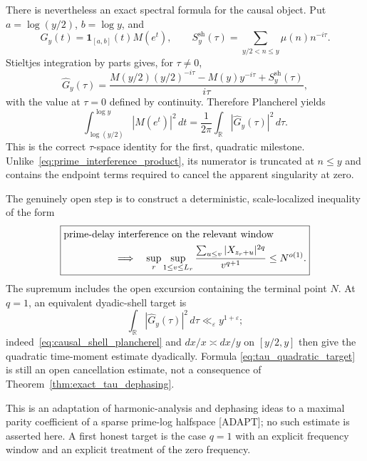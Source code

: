 \documentclass[11pt]{amsart}
\numberwithin{equation}{section}
\theoremstyle{plain}
\theoremstyle{definition}
\theoremstyle{remark}
\newcommand{\Mob}{\mu}
\newcommand{\Mert}{M}
\newcommand{\eps}{\varepsilon}
\begin{document}
There is nevertheless an exact spectral formula for the causal object.  Put
$a=\log(y/2)$, $b=\log y$, and
\begin{equation}
G_y(t)=\mathbf 1_{[a,b]}(t)\Mert(e^t),
\qquad
S_y^{\mathrm{sh}}(\tau)=
\sum_{y/2<n\leq y}\Mob(n)n^{-i\tau}.
\end{equation}
Stieltjes integration by parts gives, for $\tau\ne0$,
\begin{equation}
\widehat G_y(\tau)=
\frac{
\Mert(y/2)(y/2)^{-i\tau}-\Mert(y)y^{-i\tau}
+S_y^{\mathrm{sh}}(\tau)}{i\tau},
\label{eq:causal_shell_transform}
\end{equation}
with the value at $\tau=0$ defined by continuity.  Therefore Plancherel yields
\begin{equation}
\int_{\log(y/2)}^{\log y}|\Mert(e^t)|^2\,dt
=\frac1{2\pi}\int_{\mathbb R}|\widehat G_y(\tau)|^2\,d\tau.
\label{eq:causal_shell_plancherel}
\end{equation}
This is the correct $\tau$-space identity for the first, quadratic milestone.
Unlike~\eqref{eq:prime_interference_product}, its numerator is truncated at
$n\leq y$ and contains the endpoint terms required to cancel the apparent
singularity at zero.

The genuinely open step is to construct a deterministic, scale-localized
inequality of the form
\begin{equation}
\boxed{
\begin{aligned}
&\text{prime-delay interference on the relevant window}\\
&\hspace{18mm}\Longrightarrow\quad
\sup_{r}\sup_{1\leq v\leq L_r}
\frac{\sum_{u\leq v}|X_{z_r+u}|^{2q}}{v^{q+1}}
\leq N^{o(1)}.
\end{aligned}}
\label{eq:central_dephasing_bridge}
\end{equation}
The supremum includes the open excursion containing the terminal point $N$.
At $q=1$, an equivalent dyadic-shell target is
\begin{equation}
\int_{\mathbb R}|\widehat G_y(\tau)|^2\,d\tau
\ll_\eps y^{1+\eps};
\label{eq:tau_quadratic_target}
\end{equation}
indeed~\eqref{eq:causal_shell_plancherel} and $dx/x\asymp dx/y$ on
$[y/2,y]$ then give the quadratic time-moment estimate dyadically.  Formula
\eqref{eq:tau_quadratic_target} is still an open cancellation estimate, not a
consequence of Theorem~\ref{thm:exact_tau_dephasing}.

This is an adaptation of harmonic-analysis and dephasing ideas to a maximal
parity coefficient of a sparse prime-log halfspace \textnormal{[ADAPT]}; no
such estimate is asserted here.  A first honest target is the case $q=1$
with an explicit frequency window and an explicit treatment of the zero
frequency.
\end{document}
